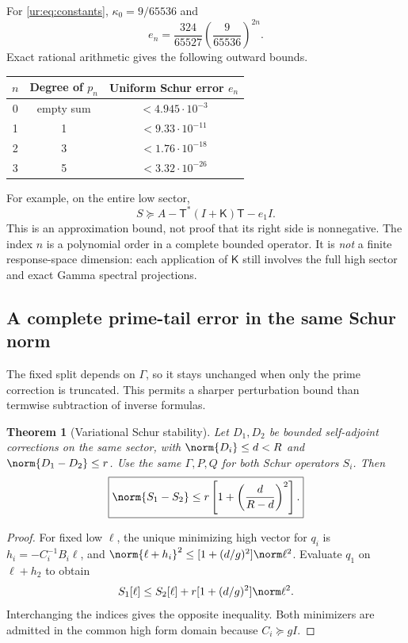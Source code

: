 \documentclass[11pt,a4paper]{article}
\numberwithin{equation}{section}
\newtheorem{theorem}{Theorem}[section]
\theoremstyle{definition}\newtheorem{definition}[theorem]{Definition}
\theoremstyle{remark}\newtheorem{remark}[theorem]{Remark}
\begin{document}
For \eqref{ur:eq:constants}, $\kappa_0=9/65536$ and
\[
 e_n=\frac{324}{65527}\left(\frac9{65536}\right)^{2n}.
\]
Exact rational arithmetic gives the following outward bounds.
\begin{center}
\begin{tabular}{ccc}\toprule
$n$ & Degree of $p_n$ & Uniform Schur error $e_n$ \\\midrule
0 & empty sum & $<4.945\cdot10^{-3}$\\
1 & 1 & $<9.33\cdot10^{-11}$\\
2 & 3 & $<1.76\cdot10^{-18}$\\
3 & 5 & $<3.32\cdot10^{-26}$\\\bottomrule
\end{tabular}
\end{center}
For example, on the entire low sector,
\[
 S\succeq A-{\mathsf T}^*(I+{\mathsf K}){\mathsf T}-e_1I.
\]
This is an approximation bound, not proof that its right side is
nonnegative. The index $n$ is a polynomial order in a complete bounded
operator. It is \emph{not} a finite response-space dimension: each
application of ${\mathsf K}$ still involves the full high sector and exact Gamma
spectral projections.

\subsection{A complete prime-tail error in the same Schur norm}
The fixed split depends on $\Gamma$, so it stays unchanged when only
the prime correction is truncated. This permits a sharper perturbation
bound than termwise subtraction of inverse formulas.

\begin{theorem}[Variational Schur stability]\label{ur:thm:stability}
Let $D_1,D_2$ be bounded self-adjoint corrections on the same sector,
with $\norm{D_i}\le d<R$ and $\norm{D_1-D_2}\le r$. Use the same
$\Gamma,P,Q$ for both Schur operators $S_i$. Then
\begin{equation}\label{ur:eq:stability}
 \boxed{\norm{S_1-S_2}\le r\left[1+\left(\frac d{R-d}\right)^2\right].}
\end{equation}
\end{theorem}
\begin{proof}
For fixed low $\ell$, the unique minimizing high vector for $q_i$ is
$h_i=-C_i^{-1}B_i\ell$, and
$\norm{\ell+h_i}^2\le[1+(d/g)^2]\norm\ell^2$.
Evaluate $q_1$ on $\ell+h_2$ to obtain
\[
 S_1[\ell]\le S_2[\ell]+r[1+(d/g)^2]\norm\ell^2.
\]
Interchanging the indices gives the opposite inequality. Both minimizers
are admitted in the common high form domain because $C_i\succeq gI$.
\end{proof}
\end{document}
